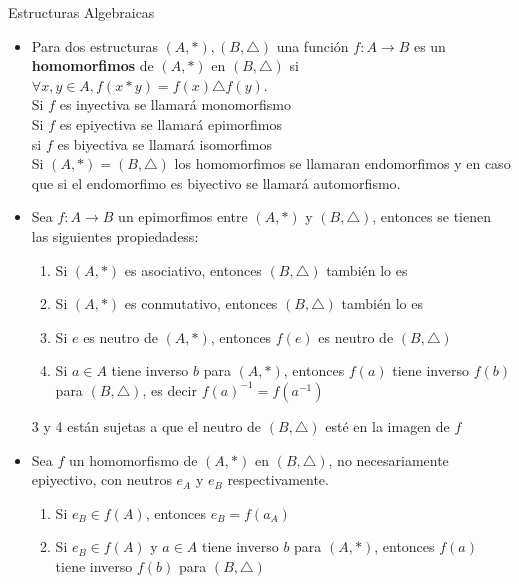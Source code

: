 \documentclass[letterpaper,10pt]{article}
\theoremstyle{plain}
\begin{document}
\begin{framed} Estructuras Algebraicas
	\begin{multicols}{2}
	    \begin{itemize}
	        \item Para dos estructuras $(A,*),(B,\triangle)$ una función $f:A\to B$ es un \textbf{homomorfimos} de $(A,*)$ en $(B,\triangle)$ si $\forall x,y\in A, f(x*y)=f(x)\triangle f(y)$.\\
            Si $f$ es inyectiva se llamará monomorfismo\\
            Si $f$ es epiyectiva se llamará epimorfimos\\
            si $f$ es biyectiva se llamará isomorfimos\\
            Si $(A,*)=(B,\triangle)$ los homomorfimos se llamaran endomorfimos y en caso que si el endomorfimo es biyectivo se llamará automorfismo.
    
            \item Sea $f:A\to B$ un epimorfimos entre $(A,*)$ y $(B,\triangle)$, entonces se tienen las siguientes propiedadess:
                \begin{enumerate}
                    \item Si $(A,*)$ es asociativo, entonces $(B,\triangle)$ también lo es
                    \item Si $(A,*)$ es conmutativo, entonces $(B,\triangle)$ también lo es
                    \item Si $e$ es neutro de $(A,*)$, entonces $f(e)$ es neutro de $(B,\triangle)$ 
                    \item Si $a\in A$ tiene inverso $b$ para $(A,*)$, entonces $f(a)$ tiene inverso $f(b)$ para $(B,\triangle)$, es decir $f(a)^{-1}=f(a^{-1})$ 
                \end{enumerate}
                3 y 4 están sujetas a que el neutro de $(B,\triangle)$ esté en la imagen de $f$
            
            \item Sea $f$ un homomorfismo de $(A,*)$ en $(B,\triangle)$, no necesariamente epiyectivo, con neutros $e_A$ y $e_B$ respectivamente.
                \begin{enumerate}
                    \item Si $e_B \in f(A)$, entonces $e_B=f(a_A)$
                    \item Si $e_B \in f(A)$ y $a\in A$ tiene inverso $b$ para $(A,*)$, entonces $f(a)$ tiene inverso $f(b)$ para $(B,\triangle)$
                \end{enumerate}
                

\end{itemize}
\end{multicols}
\end{framed}
\end{document}
